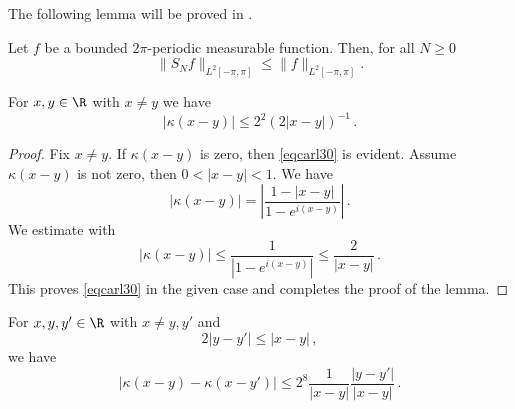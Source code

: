 The following lemma will be proved in .

\begin{lemma}
\label{spectral-projection-bound}
    Let $f$ be a bounded $2\pi$-periodic measurable function. Then, for all $N\ge 0$
   \begin{equation}\label{snbound}
   \|S_Nf\|_{L^2[-\pi, \pi]} \le \|f\|_{L^2[-\pi, \pi]}.
   \end{equation}
\end{lemma}

\begin{lemma}
\label{Hilbert-kernel-bound}
\leanok
    For $x,y\in \R$ with $x\neq y$ we have
    \begin{equation}\label{eqcarl30}
        |\kappa(x-y)|\le 2^2(2|x-y|)^{-1}\, .
    \end{equation}
\end{lemma}
\begin{proof}
\leanok
    Fix $x\neq y$. If $\kappa(x-y)$ is zero, then \eqref{eqcarl30} is evident. Assume $\kappa(x-y)$ is not zero, then $0<|x-y|<1$.
    We have
\begin{equation}\label{eqcarl31}
|\kappa(x-y)|=\left|\frac {1-|x-y|}{1-e^{i(x-y)}}\right|\, .
\end{equation}
We estimate
with 
\begin{equation}\label{eqcarl311}
|\kappa(x-y)|\le \frac {1}{|1-e^{i(x-y)}|}\le \frac 2{|x-y|}\, .
\end{equation}
This proves \eqref{eqcarl30} in the given case and completes the proof of the lemma.
\end{proof}

\begin{lemma}
\label{Hilbert-kernel-regularity}
\leanok
    For $x,y,y'\in \R$ with $x\neq y,y'$ and
    \begin{equation}
        \label{eq-close-hoelder}
        2|y-y'|\le |x-y|\, ,
    \end{equation}
    we have
    \begin{equation}\label{eqcarl301}
        |\kappa(x-y) - \kappa(x-y')|\le 2^{8}\frac{1}{|x-y|} \frac{|y-y'|}{|x-y|}\, .
    \end{equation}
\end{lemma}

